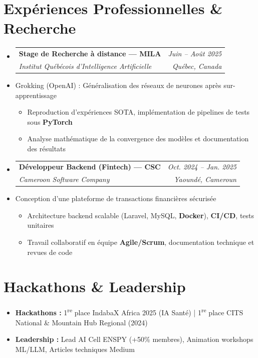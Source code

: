 ﻿\documentclass[a4paper,11pt]{article}
\makeatletter
\newcommand{\resumeItem}[1]{\item\small{#1}}
\newcommand{\resumeSubheading}[4]{
  \vspace{-1pt}\item
    \begin{tabular*}{0.97\textwidth}[t]{l@{\extracolsep{\fill}}r}
      \textbf{#1} & \textit{\small #2} \\
      \textit{\small #3} & \textit{\small #4} \\
    \end{tabular*}\vspace{-5pt}
}
\makeatother
\begin{document}
\section{Expériences Professionnelles \& Recherche}
\begin{itemize}[leftmargin=*, label={}]

    \resumeSubheading
      {Stage de Recherche à distance — MILA}{Juin -- Août 2025}
      {Institut Québécois d'Intelligence Artificielle}{Québec, Canada}
      \resumeItem{Grokking (OpenAI) : Généralisation des réseaux de neurones après sur-apprentissage}
      \begin{itemize}[leftmargin=0.4cm, nosep, label=\tiny$\bullet$]
        \item \small{Reproduction d'expériences SOTA, implémentation de pipelines de tests sous \textbf{PyTorch}}
        \item \small{Analyse mathématique de la convergence des modèles et documentation des résultats}
      \end{itemize}
    \vspace{2pt}

    \resumeSubheading
      {Développeur Backend (Fintech) — CSC}{Oct. 2024 -- Jan. 2025}
      {Cameroon Software Company}{Yaoundé, Cameroun}
      \resumeItem{Conception d'une plateforme de transactions financières sécurisée}
      \begin{itemize}[leftmargin=0.4cm, nosep, label=\tiny$\bullet$]
        \item \small{Architecture backend scalable (Laravel, MySQL, \textbf{Docker}), \textbf{CI/CD}, tests unitaires}
        \item \small{Travail collaboratif en équipe \textbf{Agile/Scrum}, documentation technique et revues de code}
      \end{itemize}

\end{itemize}

\section{Hackathons \& Leadership}
\begin{itemize}[leftmargin=*, nosep]
    \item \small{\textbf{Hackathons :} 1\textsuperscript{re} place IndabaX Africa 2025 (IA Santé) | 1\textsuperscript{re} place CITS National \& Mountain Hub Regional (2024)}
    \item \small{\textbf{Leadership :} Lead AI Cell ENSPY (+50\% membres), Animation workshops ML/LLM, Articles techniques Medium}
\end{itemize}
\end{document}

